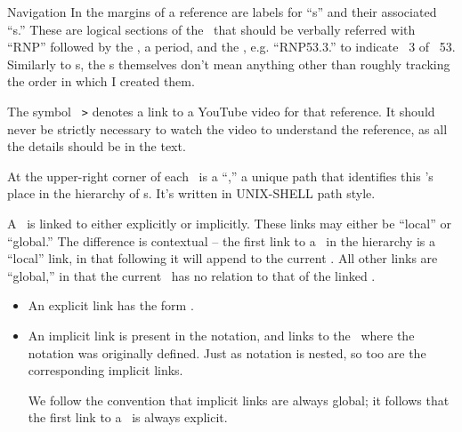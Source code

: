 \begin{part}{Navigation}
  In the margins of a reference are labels for ``s'' and their
  associated ``s.''
  These are logical sections of the \ that should 
  be verbally referred with ``RNP'' followed by 
  the , a period, and the , e.g. ``RNP53.3.'' to indicate \ 3 of \ 53.
  Similarly to s, the s themselves don't mean anything
  other than roughly tracking the order in which I created them.

  The symbol \colorbox{__gray}{\tt \color{red} >} denotes a link to a YouTube video for that reference.
  It should never be strictly necessary to watch the video to understand the reference,
  as all the details should be in the text.

  At the upper-right corner of each \ is a ``,'' 
  a unique path that identifies this 's place in the hierarchy of s.
  It's written in UNIX-SHELL path style.

  A \ is linked to either explicitly or implicitly.
  These links may either be ``local'' or ``global.'' 
  The difference is contextual -- the 
  first link to a \ in the hierarchy
  is a ``local'' link, in that following it will append to the current .
  All other links are ``global,'' in that the current \ has
  no relation to that of the linked .
  \begin{itemize}
    \item {}  An explicit link has the form \exampleln.
    \item {}  An implicit link is present in the notation, 
      and links to the \ where the notation was originally defined.
      Just as notation is nested, so too are the corresponding implicit links.

      We follow the convention that implicit links are always global;
      it follows that the first link to a \ is always explicit.
  \end{itemize}
\end{part}

